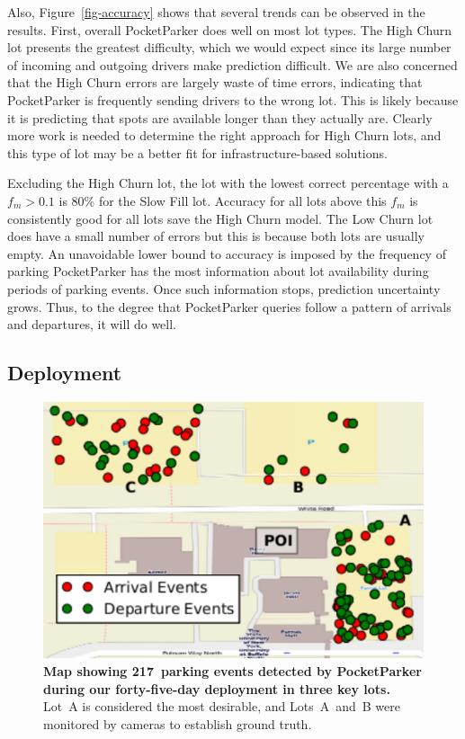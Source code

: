 Also, Figure~\ref{fig-accuracy} shows that several trends can be observed in
the results. First, overall PocketParker does well on most lot types. The
High Churn lot presents the greatest difficulty, which we would expect since
its large number of incoming and outgoing drivers make prediction difficult.
We are also concerned that the High Churn errors are largely waste of time
errors, indicating that PocketParker is frequently sending drivers to the
wrong lot. This is likely because it is predicting that spots are available
longer than they actually are. Clearly more work is needed to determine the
right approach for High Churn lots, and this type of lot may be a better fit
for infrastructure-based solutions.

Excluding the High Churn lot, the lot with the lowest correct percentage with
a $f_m > 0.1$ is 80\% for the Slow Fill lot.  Accuracy for all lots above
this $f_m$ is consistently good for all lots save the High Churn model.  The
Low Churn lot does have a small number of errors but this is because both
lots are usually empty. An unavoidable lower bound to accuracy is imposed by
the frequency of parking PocketParker has the most information about lot
availability during periods of parking events. Once such information stops,
prediction uncertainty grows. Thus, to the degree that PocketParker queries
follow a pattern of arrivals and departures, it will do well.

\newpage
\subsection{Deployment}

\begin{figure}
\centering
\includegraphics[width=\columnwidth]{./figures/smallEventsOnThreeParkingLot.pdf}

\caption{\textbf{Map showing 217~parking events detected by PocketParker
during our forty-five-day deployment in three key lots.} Lot~A is considered
the most desirable, and Lots~A~and~B were monitored by cameras to establish
ground truth.}

\label{fig-events}
\end{figure}

